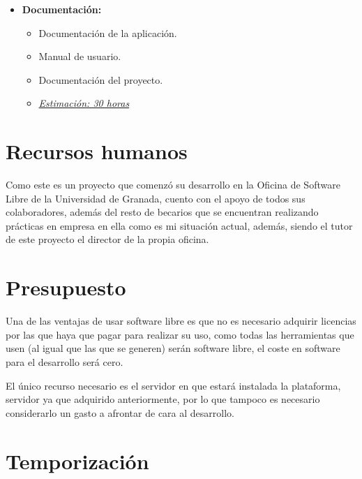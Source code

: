 \begin{itemize}
 \item \textbf{Documentación:}
 \begin{itemize}
  \item Documentación de la aplicación.
  \item Manual de usuario.
  \item Documentación del proyecto.
  \item \underline{\textit{Estimación: 30 horas}}
 \end{itemize}
\end{itemize}

\section{Recursos humanos}

Como este es un proyecto que comenzó su desarrollo en la Oficina de Software Libre de la Universidad de Granada, cuento con el
apoyo de todos sus colaboradores, además del resto de becarios que se encuentran realizando prácticas en empresa en ella
como es mi situación actual, además, siendo el tutor de este proyecto el director de la propia oficina.

\section{Presupuesto}

Una de las ventajas de usar software libre es que no es necesario adquirir licencias por las que haya que pagar para realizar 
su uso, como todas las herramientas que usen (al igual que las que se generen) serán software libre, el coste en software para 
el desarrollo será cero.

\bigskip

El único recurso necesario es el servidor en que estará instalada la plataforma, servidor ya que adquirido anteriormente, por
lo que tampoco es necesario considerarlo un gasto a afrontar de cara al desarrollo.

\section{Temporización}
